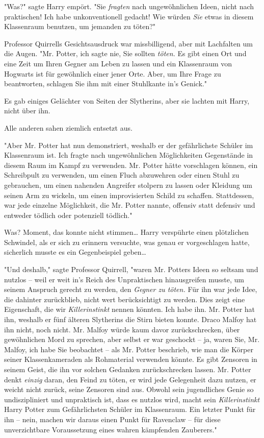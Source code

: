 {"Was?" sagte Harry empört. "Sie \emph{fragten} nach ungewöhnlichen Ideen, nicht nach praktischen! Ich habe unkonventionell gedacht! Wie würden \emph{Sie} etwas in diesem Klassenraum benutzen, um jemanden zu töten?"

Professor Quirrells Gesichtsausdruck war missbilligend, aber mit Lachfalten um die Augen. "Mr. Potter, ich sagte nie, Sie sollten \emph{töten.} Es gibt einen Ort und eine Zeit um Ihren Gegner am Leben zu lassen und ein Klassenraum von Hogwarts ist für gewöhnlich einer jener Orte. Aber, um Ihre Frage zu beantworten, schlagen Sie ihm mit einer Stuhlkante in's Genick."

Es gab einiges Gelächter von Seiten der Slytherins, aber sie lachten mit Harry, nicht über ihn.

Alle anderen sahen ziemlich entsetzt aus.

"Aber Mr. Potter hat nun demonstriert, weshalb er der gefährlichste Schüler im Klassenraum ist. Ich fragte nach ungewöhnlichen Möglichkeiten Gegenstände in diesem Raum im Kampf zu verwenden. Mr. Potter hätte vorschlagen können, ein Schreibpult zu verwenden, um einen Fluch abzuwehren oder einen Stuhl zu gebrauchen, um einen nahenden Angreifer stolpern zu lassen oder Kleidung um seinen Arm zu wickeln, um einen improvisierten Schild zu schaffen. Stattdessen, war jede einzelne Möglichkeit, die Mr. Potter nannte, offensiv statt defensiv und entweder tödlich oder potenziell tödlich."

Was? Moment, das konnte nicht stimmen… Harry verspührte einen plötzlichen Schwindel, als er sich zu erinnern versuchte, was genau er vorgeschlagen hatte, sicherlich musste es ein Gegenbeispiel geben…

"Und deshalb," sagte Professor Quirrell, "waren Mr. Potters Ideen so seltsam und nutzlos -- weil er weit in's Reich des Unpraktischen hinausgreifen musste, um seinem Anspruch gerecht zu werden, den \emph{Gegner zu töten.} Für ihn war jede Idee, die dahinter zurückblieb, nicht wert berücksichtigt zu werden. Dies zeigt eine Eigenschaft, die wir \emph{Killerinstinkt} nennen könnten. Ich habe ihn. Mr. Potter hat ihn, weshalb er fünf älteren Slytherins die Stirn bieten konnte. Draco Malfoy hat ihn nicht, noch nicht. Mr. Malfoy würde kaum davor zurückschrecken, über gewöhnlichen Mord zu sprechen, aber selbst er war geschockt -- ja, waren Sie, Mr. Malfoy, ich habe Sie beobachtet -- als Mr. Potter beschrieb, wie man die Körper seiner Klassenkameraden als Rohmaterial verwenden könnte. Es gibt Zensoren in seinem Geist, die ihn vor solchen Gedanken zurückschrecken lassen. Mr. Potter denkt \emph{einzig} daran, den Feind zu töten, er wird jede Gelegenheit dazu nutzen, er weicht nicht zurück, seine Zensoren sind aus. Obwohl sein jugendliches Genie so undiszipliniert und unpraktisch ist, dass es nutzlos wird, macht sein \emph{Killerinstinkt} Harry Potter zum Gefährlichsten Schüler im Klassenraum. Ein letzter Punkt für ihn -- nein, machen wir daraus einen Punkt für Ravenclaw -- für diese unverzichtbare Voraussetzung eines wahren kämpfenden Zauberers."

}
